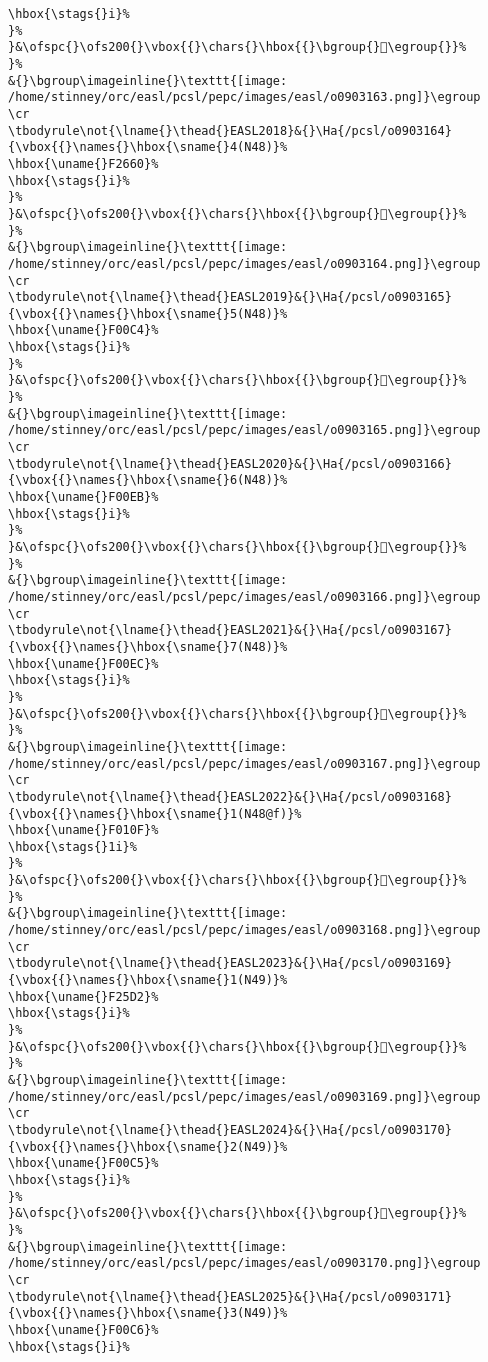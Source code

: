 \begin{verbatim}
\hbox{\stags{}i}%
}%
}&\ofspc{}\ofs200{}\vbox{{}\chars{}\hbox{{}\bgroup{}󰃃\egroup{}}%
}%
&{}\bgroup\imageinline{}\texttt{[image: /home/stinney/orc/easl/pcsl/pepc/images/easl/o0903163.png]}\egroup
\cr
\tbodyrule\not{\lname{}\thead{}EASL2018}&{}\Ha{/pcsl/o0903164}{\vbox{{}\names{}\hbox{\sname{}4(N48)}%
\hbox{\uname{}F2660}%
\hbox{\stags{}i}%
}%
}&\ofspc{}\ofs200{}\vbox{{}\chars{}\hbox{{}\bgroup{}󲙠\egroup{}}%
}%
&{}\bgroup\imageinline{}\texttt{[image: /home/stinney/orc/easl/pcsl/pepc/images/easl/o0903164.png]}\egroup
\cr
\tbodyrule\not{\lname{}\thead{}EASL2019}&{}\Ha{/pcsl/o0903165}{\vbox{{}\names{}\hbox{\sname{}5(N48)}%
\hbox{\uname{}F00C4}%
\hbox{\stags{}i}%
}%
}&\ofspc{}\ofs200{}\vbox{{}\chars{}\hbox{{}\bgroup{}󰃄\egroup{}}%
}%
&{}\bgroup\imageinline{}\texttt{[image: /home/stinney/orc/easl/pcsl/pepc/images/easl/o0903165.png]}\egroup
\cr
\tbodyrule\not{\lname{}\thead{}EASL2020}&{}\Ha{/pcsl/o0903166}{\vbox{{}\names{}\hbox{\sname{}6(N48)}%
\hbox{\uname{}F00EB}%
\hbox{\stags{}i}%
}%
}&\ofspc{}\ofs200{}\vbox{{}\chars{}\hbox{{}\bgroup{}󰃫\egroup{}}%
}%
&{}\bgroup\imageinline{}\texttt{[image: /home/stinney/orc/easl/pcsl/pepc/images/easl/o0903166.png]}\egroup
\cr
\tbodyrule\not{\lname{}\thead{}EASL2021}&{}\Ha{/pcsl/o0903167}{\vbox{{}\names{}\hbox{\sname{}7(N48)}%
\hbox{\uname{}F00EC}%
\hbox{\stags{}i}%
}%
}&\ofspc{}\ofs200{}\vbox{{}\chars{}\hbox{{}\bgroup{}󰃬\egroup{}}%
}%
&{}\bgroup\imageinline{}\texttt{[image: /home/stinney/orc/easl/pcsl/pepc/images/easl/o0903167.png]}\egroup
\cr
\tbodyrule\not{\lname{}\thead{}EASL2022}&{}\Ha{/pcsl/o0903168}{\vbox{{}\names{}\hbox{\sname{}1(N48@f)}%
\hbox{\uname{}F010F}%
\hbox{\stags{}1i}%
}%
}&\ofspc{}\ofs200{}\vbox{{}\chars{}\hbox{{}\bgroup{}󰄏\egroup{}}%
}%
&{}\bgroup\imageinline{}\texttt{[image: /home/stinney/orc/easl/pcsl/pepc/images/easl/o0903168.png]}\egroup
\cr
\tbodyrule\not{\lname{}\thead{}EASL2023}&{}\Ha{/pcsl/o0903169}{\vbox{{}\names{}\hbox{\sname{}1(N49)}%
\hbox{\uname{}F25D2}%
\hbox{\stags{}i}%
}%
}&\ofspc{}\ofs200{}\vbox{{}\chars{}\hbox{{}\bgroup{}󲗒\egroup{}}%
}%
&{}\bgroup\imageinline{}\texttt{[image: /home/stinney/orc/easl/pcsl/pepc/images/easl/o0903169.png]}\egroup
\cr
\tbodyrule\not{\lname{}\thead{}EASL2024}&{}\Ha{/pcsl/o0903170}{\vbox{{}\names{}\hbox{\sname{}2(N49)}%
\hbox{\uname{}F00C5}%
\hbox{\stags{}i}%
}%
}&\ofspc{}\ofs200{}\vbox{{}\chars{}\hbox{{}\bgroup{}󰃅\egroup{}}%
}%
&{}\bgroup\imageinline{}\texttt{[image: /home/stinney/orc/easl/pcsl/pepc/images/easl/o0903170.png]}\egroup
\cr
\tbodyrule\not{\lname{}\thead{}EASL2025}&{}\Ha{/pcsl/o0903171}{\vbox{{}\names{}\hbox{\sname{}3(N49)}%
\hbox{\uname{}F00C6}%
\hbox{\stags{}i}%

\end{verbatim}
